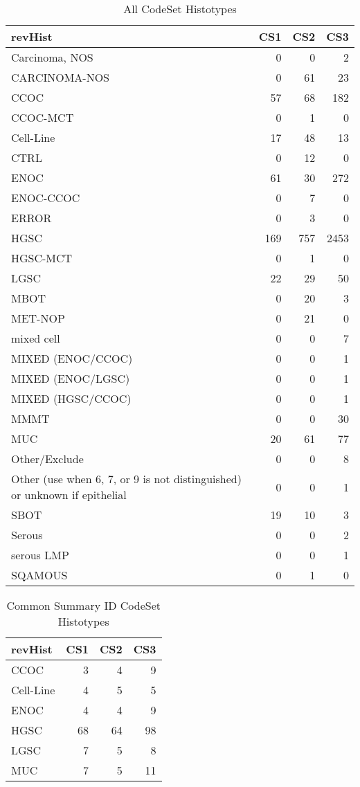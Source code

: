 \documentclass[
]{report}
\begin{document}
\begin{table}

\caption{\label{tab:dist-all}All CodeSet Histotypes}
\centering
\begin{tabular}[t]{l|r|r|r}
\hline
revHist & CS1 & CS2 & CS3\\
\hline
Carcinoma, NOS & 0 & 0 & 2\\
\hline
CARCINOMA-NOS & 0 & 61 & 23\\
\hline
CCOC & 57 & 68 & 182\\
\hline
CCOC-MCT & 0 & 1 & 0\\
\hline
Cell-Line & 17 & 48 & 13\\
\hline
CTRL & 0 & 12 & 0\\
\hline
ENOC & 61 & 30 & 272\\
\hline
ENOC-CCOC & 0 & 7 & 0\\
\hline
ERROR & 0 & 3 & 0\\
\hline
HGSC & 169 & 757 & 2453\\
\hline
HGSC-MCT & 0 & 1 & 0\\
\hline
LGSC & 22 & 29 & 50\\
\hline
MBOT & 0 & 20 & 3\\
\hline
MET-NOP & 0 & 21 & 0\\
\hline
mixed cell & 0 & 0 & 7\\
\hline
MIXED (ENOC/CCOC) & 0 & 0 & 1\\
\hline
MIXED (ENOC/LGSC) & 0 & 0 & 1\\
\hline
MIXED (HGSC/CCOC) & 0 & 0 & 1\\
\hline
MMMT & 0 & 0 & 30\\
\hline
MUC & 20 & 61 & 77\\
\hline
Other/Exclude & 0 & 0 & 8\\
\hline
Other (use when 6, 7, or 9 is not distinguished) or unknown if epithelial & 0 & 0 & 1\\
\hline
SBOT & 19 & 10 & 3\\
\hline
Serous & 0 & 0 & 2\\
\hline
serous LMP & 0 & 0 & 1\\
\hline
SQAMOUS & 0 & 1 & 0\\
\hline
\end{tabular}
\end{table}

\begin{table}

\caption{\label{tab:dist-common}Common Summary ID CodeSet Histotypes}
\centering
\begin{tabular}[t]{l|r|r|r}
\hline
revHist & CS1 & CS2 & CS3\\
\hline
CCOC & 3 & 4 & 9\\
\hline
Cell-Line & 4 & 5 & 5\\
\hline
ENOC & 4 & 4 & 9\\
\hline
HGSC & 68 & 64 & 98\\
\hline
LGSC & 7 & 5 & 8\\
\hline
MUC & 7 & 5 & 11\\
\hline
\end{tabular}
\end{table}
\end{document}
